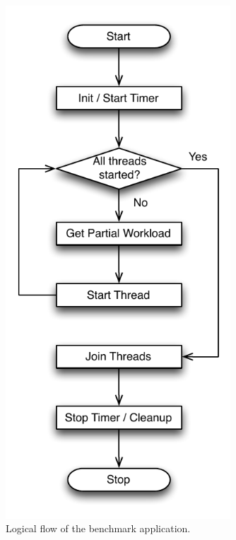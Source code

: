 \begin{figure}[h!]
\begin{minipage}[l]{0.50\textwidth}
    \includegraphics[width=0.75\textwidth]{figures/bench/host}
    \caption{Logical flow of the benchmark application.}
    \label{fig:eval-host}
\end{minipage}
\begin{minipage}[l]{0.50\textwidth}

\end{minipage}
\end{figure}
